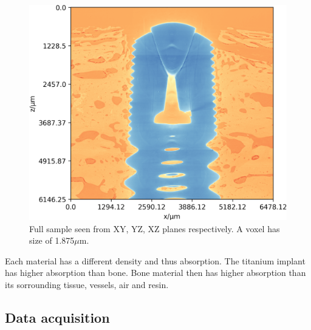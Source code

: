 \begin{figure}
\includegraphics[width=\columnwidth]{figures/770c_pag-full-xz-1x.png}
\caption{Full sample seen from XY, YZ, XZ planes respectively. A voxel has size of 1.875$\mu$m.}
\label{fig:3viewsample}
\end{figure}

Each material has a different density and thus absorption. The titanium implant has higher absorption than bone.
Bone material then has higher absorption than its sorrounding tissue, vessels, air and resin.

\subsection{Data acquisition}

